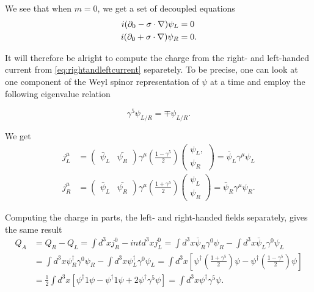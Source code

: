 \documentclass[11pt, a4paper]{amsart}
\begin{document}
We see that when $m=0$, we get a set of decoupled equations
\begin{align}
i(\partial_0 - \vb{\sigma} \cdot \nabla) \psi_L &= 0 \\
i(\partial_0 + \vb{\sigma} \cdot \nabla) \psi_R &= 0.
\end{align}

It will therefore be alright to compute the charge from the right- and left-handed current from \autoref{eq:rightandleftcurrent} separetely.  To be precise, one can look at one component of the Weyl spinor representation of $\psi$ at a time and employ the following eigenvalue relation

\begin{equation}
\gamma^5 \psi_{L/R} = \mp \psi_{L/R}.
\end{equation}

We get
\begin{align}
j_L^\mu &= \begin{pmatrix}
\bar{\psi}_L & \bar{\psi_R}
\end{pmatrix}\gamma^\mu \left(\frac{1 - \gamma^5}{2}\right) 
\begin{pmatrix}
\psi_L, \\
\psi_R
\end{pmatrix} = \bar{\psi}_L \gamma^\mu \psi_L \\
j_R^\mu &= \begin{pmatrix}
\bar{\psi}_L & \bar{\psi_R}
\end{pmatrix}\gamma^\mu \left(\frac{1 + \gamma^5}{2}\right) 
\begin{pmatrix}
\psi_L \\
\psi_R
\end{pmatrix} = \bar{\psi}_R \gamma^\mu \psi_R.
\end{align}

Computing the charge in parts, the left- and right-handed fields separately, gives the same result
\begin{align*}
Q_A &= Q_R - Q_L = \int d^3x j_R^0 - int d^3x j_L^0 = \int d^3x \bar{\psi}_R\gamma^0\psi_R - \int d^3x \bar{\psi}_L\gamma^0\psi_L \\
	&= \int d^3x \psi^\dagger_R\gamma^0\psi_R - \int d^3x \psi^\dagger_L\gamma^0\psi_L 
	  = \int d^3x \left[\psi^\dagger\left(\frac{1 + \gamma^5}{2} \right) \psi - \psi^\dagger\left(\frac{1 - \gamma^5}{2} \right) \psi  \right] \\
	&= \frac{1}{2} \int d^3x \left[\psi^\dagger 1 \psi - \psi^\dagger 1 \psi + 2\psi^\dagger \gamma^5 \psi \right] 
	   = \int d^3x \psi^\dagger \gamma^5 \psi.
\end{align*}
\end{document}
